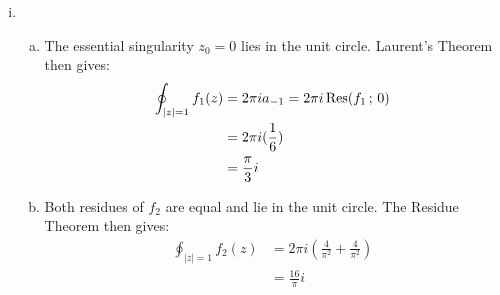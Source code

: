 \documentclass[letterpaper, titlepage, DIV=14]{scrartcl}
\begin{document}
\begin{enumerate}[i)]
      \item 
      \begin{enumerate}[a)]
        \item
        The essential singularity $z_{0}=0$ lies in the unit circle. Laurent's Theorem then gives:
        \begin{align*}
          \oint_{|z|=1}f_{1}(z) &= 2\pi ia_{-1} = 2\pi i\Res(f_{1} \, ; \, 0) \\
            &= 2\pi i (\frac{1}{6}) \\
            &= \frac{\pi}{3}i
        \end{align*}

        \item 
        Both residues of $f_{2}$ are equal and lie in the unit circle. The Residue Theorem then gives:
        \begin{align*}
          \oint_{|z|=1}f_{2}(z) &= 2\pi i(\frac{4}{\pi^{2}} + \frac{4}{\pi^{2}}) \\
            &= \frac{16}{\pi}i
        \end{align*}
      \end{enumerate}
    
    \end{enumerate}
\end{document}
